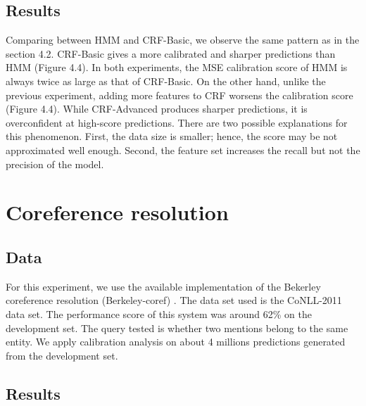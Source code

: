 \subsection{Results}

Comparing between HMM and CRF-Basic, we observe the same pattern as in the section 4.2. CRF-Basic gives a more calibrated and sharper predictions than HMM (Figure 4.4). In both experiments, the MSE calibration score of HMM is always twice as large as that of CRF-Basic. On the other hand, unlike the previous experiment, adding more features to CRF worsens the calibration score (Figure 4.4). While CRF-Advanced produces sharper predictions, it is overconfident at high-score predictions. There are two possible explanations for this phenomenon. First, the data size is smaller; hence, the score may be not approximated well enough. Second, the feature set increases the recall but not the precision of the model.

\section{Coreference resolution}

\subsection{Data}

For this experiment, we use the available implementation of the Bekerley coreference resolution (Berkeley-coref) \citep{durrett2013easy}. The data set used is the CoNLL-2011 data set. The performance score of this system was around 62\% on the development set. The query tested is whether two mentions belong to the same entity. We apply calibration analysis on about 4 millions predictions generated from the development set. 

\subsection{Results}

